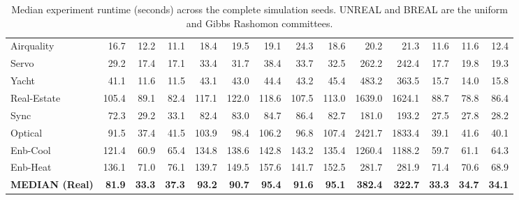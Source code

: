 \begin{table}[htbp]
\begin{tabular}{l rrrrrrrrrrrrr}
        \midrule
        Airquality & 16.7 & 12.2 & 11.1 & 18.4 & 19.5 & 19.1 & 24.3 & 18.6 & 20.2 & 21.3 & 11.6 & 11.6 & 12.4 \\
        Servo & 29.2 & 17.4 & 17.1 & 33.4 & 31.7 & 38.4 & 33.7 & 32.5 & 262.2 & 242.4 & 17.7 & 19.8 & 19.3 \\
        Yacht & 41.1 & 11.6 & 11.5 & 43.1 & 43.0 & 44.4 & 43.2 & 45.4 & 483.2 & 363.5 & 15.7 & 14.0 & 15.8 \\
        Real-Estate & 105.4 & 89.1 & 82.4 & 117.1 & 122.0 & 118.6 & 107.5 & 113.0 & 1639.0 & 1624.1 & 88.7 & 78.8 & 86.4 \\
        Sync & 72.3 & 29.2 & 33.1 & 82.4 & 83.0 & 84.7 & 86.4 & 82.7 & 181.0 & 193.2 & 27.5 & 27.8 & 28.2 \\
        Optical & 91.5 & 37.4 & 41.5 & 103.9 & 98.4 & 106.2 & 96.8 & 107.4 & 2421.7 & 1833.4 & 39.1 & 41.6 & 40.1 \\
        Enb-Cool & 121.4 & 60.9 & 65.4 & 134.8 & 138.6 & 142.8 & 143.2 & 135.4 & 1260.4 & 1188.2 & 59.7 & 61.1 & 64.3 \\
        Enb-Heat & 136.1 & 71.0 & 76.1 & 139.7 & 149.5 & 157.6 & 141.7 & 152.5 & 281.7 & 281.9 & 71.4 & 70.6 & 68.9 \\
        \midrule
        \textbf{MEDIAN (Real)} & \textbf{81.9} & \textbf{33.3} & \textbf{37.3} & \textbf{93.2} & \textbf{90.7} & \textbf{95.4} & \textbf{91.6} & \textbf{95.1} & \textbf{382.4} & \textbf{322.7} & \textbf{33.3} & \textbf{34.7} & \textbf{34.1} \\
        \bottomrule
    \end{tabular}
    \caption{Median experiment runtime (seconds) across the complete simulation seeds. UNREAL and BREAL are the uniform and Gibbs Rashomon committees.}
    \label{tab:RuntimeComparison}
\end{table}
